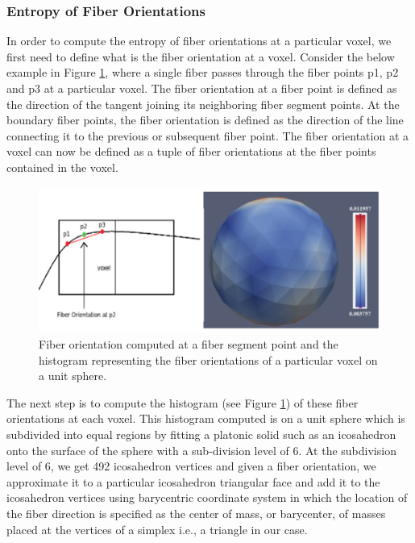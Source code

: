 \documentclass{llncs}
\begin{document}
%
\subsubsection{Entropy of Fiber Orientations}
%
In order to compute the entropy of fiber orientations at a particular voxel, we first need to define what is the fiber orientation at a voxel. Consider the below example in Figure \ref{fig:histogram}, where a single fiber passes through the fiber points p1, p2 and p3 at a particular voxel. The fiber orientation at a fiber point is defined as the direction of the tangent joining its neighboring fiber segment points. At the boundary fiber points, the fiber orientation is defined as the direction of the line connecting it to the previous or subsequent fiber point. The fiber orientation at a voxel can now be defined as a tuple of fiber orientations at the fiber points contained in the voxel.

\begin{figure}
\centering
\includegraphics[width=1\columnwidth]{images/fiber_orientation_histogram.png}
\caption{Fiber orientation computed at a fiber segment point and the histogram representing the fiber orientations of a particular voxel on a unit sphere.}
\label{fig:histogram}
\end{figure}
%
The next step is to compute the histogram (see Figure \ref{fig:histogram}) of these fiber orientations at each voxel. This histogram computed is on a unit sphere which is subdivided into equal regions by fitting a platonic solid such as an icosahedron onto the surface of the sphere with a sub-division level of 6.  At the subdivision level of 6, we get 492 icosahedron vertices and given a fiber orientation, we approximate it to a particular icosahedron triangular face and add it to the icosahedron vertices using barycentric coordinate system in which the location of the fiber direction is specified as the center of mass, or barycenter, of masses placed at the vertices of a simplex i.e., a triangle in our case.
\end{document}
